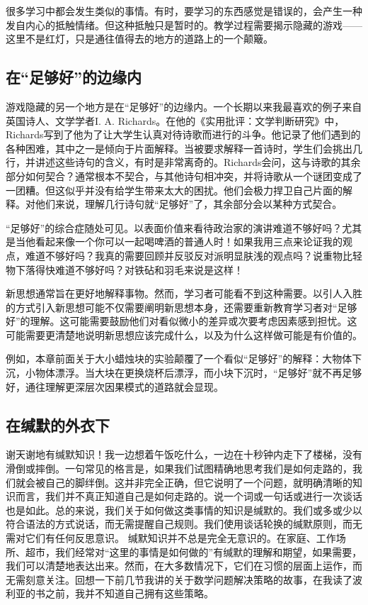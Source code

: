 很多学习中都会发生类似的事情。有时，要学习的东西感觉是错误的，会产生一种发自内心的抵触情绪。但这种抵触只是暂时的。教学过程需要揭示隐藏的游戏——这里不是红灯，只是通往值得去的地方的道路上的一个颠簸。

\subsection*{在“足够好”的边缘内}

游戏隐藏的另一个地方是在“足够好”的边缘内。一个长期以来我最喜欢的例子来自英国诗人、文学学者I. A. Richards。在他的《实用批评：文学判断研究》中，Richards写到了他为了让大学生认真对待诗歌而进行的斗争。他记录了他们遇到的各种困难，其中之一是倾向于片面解释。当被要求解释一首诗时，学生们会挑出几行，并讲述这些诗句的含义，有时是非常离奇的。Richards会问，这与诗歌的其余部分如何契合？通常根本不契合，与其他诗句相冲突，并将诗歌从一个谜团变成了一团糟。但这似乎并没有给学生带来太大的困扰。他们会极力捍卫自己片面的解释。对他们来说，理解几行诗句就“足够好”了，其余部分会以某种方式契合。

“足够好”的综合症随处可见。以表面价值来看待政治家的演讲难道不够好吗？尤其是当他看起来像一个你可以一起喝啤酒的普通人时！如果我用三点来论证我的观点，难道不够好吗？我真的需要回顾并反驳反对派明显肤浅的观点吗？说重物比轻物下落得快难道不够好吗？对铁砧和羽毛来说是这样！

新思想通常旨在更好地解释事物。然而，学习者可能看不到这种需要。以引人入胜的方式引入新思想可能不仅需要阐明新思想本身，还需要重新教育学习者对“足够好”的理解。这可能需要鼓励他们对看似微小的差异或次要考虑因素感到担忧。这可能需要更清楚地说明新思想应该完成什么，以及为什么这样做可能是有价值的。

例如，本章前面关于大小蜡烛块的实验颠覆了一个看似“足够好”的解释：大物体下沉，小物体漂浮。当大块在更换烧杯后漂浮，而小块下沉时，“足够好”就不再足够好，通往理解更深层次因果模式的道路就会显现。

\subsection*{在缄默的外衣下}

谢天谢地有缄默知识！我一边想着午饭吃什么，一边在十秒钟内走下了楼梯，没有滑倒或摔倒。一句常见的格言是，如果我们试图精确地思考我们是如何走路的，我们就会被自己的脚绊倒。这并非完全正确，但它说明了一个问题，就明确清晰的知识而言，我们并不真正知道自己是如何走路的。说一个词或一句话或进行一次谈话也是如此。总的来说，我们关于如何做这类事情的知识是缄默的。我们或多或少以符合语法的方式说话，而无需提醒自己规则。我们使用谈话轮换的缄默原则，而无需对它们有任何反思意识。
缄默知识并不总是完全无意识的。在家庭、工作场所、超市，我们经常对“这里的事情是如何做的”有缄默的理解和期望，如果需要，我们可以清楚地表达出来。然而，在大多数情况下，它们在习惯的层面上运作，而无需刻意关注。回想一下前几节我讲的关于数学问题解决策略的故事，在我读了波利亚的书之前，我并不知道自己拥有这些策略。

